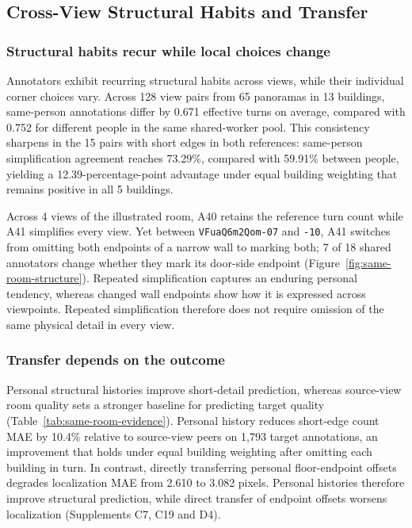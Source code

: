 \subsection{Cross-View Structural Habits and Transfer}
\label{sec:viewpoint-scope}
\subsubsection{Structural habits recur while local choices change}

Annotators exhibit recurring structural habits across views, while their individual corner choices vary. Across 128 view pairs from 65 panoramas in 13 buildings, same-person annotations differ by 0.671 effective turns on average, compared with 0.752 for different people in the same shared-worker pool. This consistency sharpens in the 15 pairs with short edges in both references: same-person simplification agreement reaches 73.29\%, compared with 59.91\% between people, yielding a 12.39-percentage-point advantage under equal building weighting that remains positive in all 5 buildings.



Across 4 views of the illustrated room, A40 retains the reference turn count while A41 simplifies every view. Yet between \texttt{VFuaQ6m2Qom-07} and \texttt{-10}, A41 switches from omitting both endpoints of a narrow wall to marking both; 7 of 18 shared annotators change whether they mark its door-side endpoint (Figure~\ref{fig:same-room-structure}). Repeated simplification captures an enduring personal tendency, whereas changed wall endpoints show how it is expressed across viewpoints. Repeated simplification therefore does not require omission of the same physical detail in every view.

\subsubsection{Transfer depends on the outcome}

Personal structural histories improve short-detail prediction, whereas source-view room quality sets a stronger baseline for predicting target quality (Table~\ref{tab:same-room-evidence}). Personal history reduces short-edge count MAE by 10.4\% relative to source-view peers on 1,793 target annotations, an improvement that holds under equal building weighting after omitting each building in turn. In contrast, directly transferring personal floor-endpoint offsets degrades localization MAE from 2.610 to 3.082 pixels. Personal histories therefore improve structural prediction, while direct transfer of endpoint offsets worsens localization (Supplements C7, C19 and D4).

